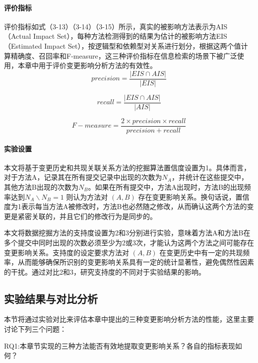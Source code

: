 \paragraph{评价指标}

评价指标如式（3-13）（3-14）（3-15）所示，真实的被影响方法表示为AIS（Actual Impact Set），每种方法检测得到的结果为估计的被影响方法EIS（Estimated Impact Set），按逻辑型和依赖型对关系进行划分，根据这两个值计算精确度、召回率和F-measure，这三种评价指标在信息检索的场景下被广泛使用，本章中用于评价变更影响分析方法的有效性。
\begin{equation}
{precision} = \frac{|EIS \cap AIS|}{|EIS|}
\end{equation}

\begin{equation}
{recall} = \frac{|EIS \cap AIS|}{|AIS|}
\end{equation}

\begin{equation}
F-measure = \frac{2 \times precision \times recall}{precision + recall}
\end{equation}

\paragraph{实验设置}


本文将基于变更历史和共现关联关系方法的挖掘算法置信度设置为1。具体而言，对于方法A，记录其在所有提交记录中出现的次数为\(N_A\)，并统计在这些提交中，其他方法B出现的次数为\(N_B\)。如果在所有提交中，方法A出现时，方法B的出现频率达到\(N_A \backslash N_B = 1\)
则认为方法对 $(A, B)$ 存在变更影响关系。换句话说，置信度为1表示每当方法A被修改时，方法B也必然随之修改，从而确认这两个方法的变更是紧密关联的，并且它们的修改行为是同步的。

本文将数据挖掘方法的支持度设置为2和3分别进行实验，意味着方法A和方法B在多个提交中同时出现的次数必须至少为2或3次，才能认为这两个方法之间可能存在变更影响关系。支持度的设定要求方法对 $(A, B)$ 在变更历史中有一定的共现频率，从而能够确保所识别的变更影响关系具有一定的统计显著性，避免偶然性因素的干扰。通过对比2和3，研究支持度的不同对于实验结果的影响。

\subsection{实验结果与对比分析}

本节将通过实验对比来评估本章中提出的三种变更影响分析方法的性能，这里主要讨论下列三个问题：

RQ1:本章节实现的三种方法能否有效地提取变更影响关系？各自的指标表现如何？

